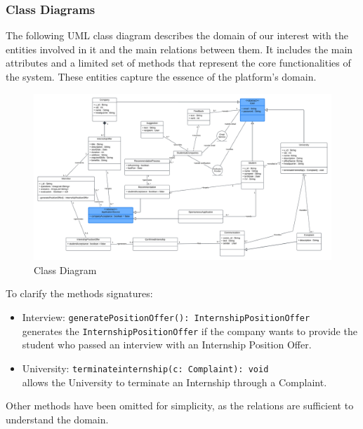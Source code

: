 \subsubsection{Class Diagrams}
The following UML class diagram describes the domain of our interest with the entities involved in it and the main relations between them. It includes the main attributes and a limited set of methods that represent the core functionalities of the system. These entities capture the essence of the platform's domain.
\begin{figure}[H]
    \centering
    \includegraphics[width=\linewidth]{Latex/Images/RASD/ClassDiagrams/ClassDiagram2.1.png}
    \caption{Class Diagram}
    \label{fig:ClassDiagram}
\end{figure}
To clarify the methods signatures:
\begin{itemize}
    \item Interview: \verb|generatePositionOffer(): InternshipPositionOffer| \\generates the \verb|InternshipPositionOffer| if the company wants to provide the student who passed an interview with an Internship Position Offer. 
    \item University: \verb|terminateinternship(c: Complaint): void| \\allows the University to terminate an Internship through a Complaint.
\end{itemize}
Other methods have been omitted for simplicity, as the relations are sufficient to understand the domain. 
\clearpage
